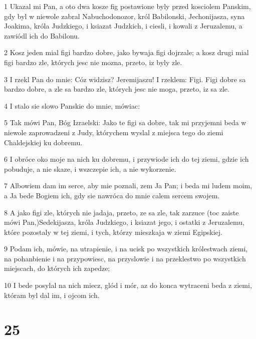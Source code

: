 \par 1 Ukazal mi Pan, a oto dwa kosze fig postawione byly przed kosciolem Panskim, gdy byl w niewole zabral Nabuchodonozor, król Babilonski, Jechonijasza, syna Joakima, króla Judzkiego, i ksiazat Judzkich, i ciesli, i kowali z Jeruzalemu, a zawiódl ich do Babilonu.
\par 2 Kosz jeden mial figi bardzo dobre, jako bywaja figi dojrzale; a kosz drugi mial figi bardzo zle, których jesc nie mozna, przeto, iz byly zle.
\par 3 I rzekl Pan do mnie: Cóz widzisz? Jeremijaszu! I rzeklem: Figi. Figi dobre sa bardzo dobre, a zle sa bardzo zle, których jesc nie moga, przeto, iz sa zle.
\par 4 I stalo sie slowo Panskie do mnie, mówiac:
\par 5 Tak mówi Pan, Bóg Izraelski: Jako te figi sa dobre, tak mi przyjemni beda w niewole zaprowadzeni z Judy, którychem wyslal z miejsca tego do ziemi Chaldejskiej ku dobremu.
\par 6 I obróce oko moje na nich ku dobremu, i przywiode ich do tej ziemi, gdzie ich pobuduje, a nie skaze, i wszczepie ich, a nie wykorzenie.
\par 7 Albowiem dam im serce, aby mie poznali, zem Ja Pan; i beda mi ludem moim, a Ja bede Bogiem ich, gdy sie nawróca do mnie calem sercem swojem.
\par 8 A jako figi zle, których nie jadaja, przeto, ze sa zle, tak zarzuce (toc zaiste mówi Pan,)Sedekijasza, króla Judzkiego, i ksiazat jego, i ostatki z Jeruzalemu, które pozostaly w tej ziemi, i tych, którzy mieszkaja w ziemi Egipskiej.
\par 9 Podam ich, mówie, na utrapienie, i na ucisk po wszystkich królestwach ziemi, na pohanbienie i na przypowiesc, na przyslowie i na przeklestwo po wszystkich miejscach, do których ich zapedze;
\par 10 I bede posylal na nich miecz, glód i mór, az do konca wytraceni beda z ziemi, któram byl dal im, i ojcom ich.

\chapter{25}

